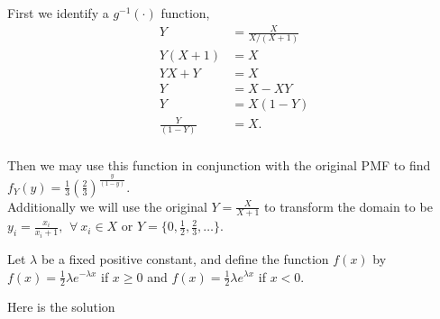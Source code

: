 \documentclass[12pt,letterpaper]{exam}
\begin{document}
\begin{questions}
	\begin{solution}
		First we identify a $g^{-1}(\cdot)$ function,
		\begin{align*}
			Y &= \frac{X}{X/(X+1)} \\
			Y(X+1) &= X \\
			YX+Y &= X \\
			Y &= X- XY \\
			Y &= X(1-Y) \\
			\frac{Y}{(1-Y)} &= X. \\
		\end{align*}
		
		Then we may use this function in conjunction with the original PMF to find
		$f_Y(y) = \frac{1}{3}\left(\frac{2}{3}\right)^\frac{y}{(1-y)}$. \\
		Additionally we will use the original ${Y} = \frac{X}{X+1}$ to transform the domain
		to be ${y_i} = \frac{x_i}{x_i+1}, \,\ \forall\ x_i\in X$ or
		$Y = \{0,\frac{1}{2},\frac{2}{3},\ldots\}$. \\
		
	\end{solution}
	\clearpage
	
	\question Let $\lambda$ be a fixed positive constant, and define the function $f(x)$ by $f(x) = \frac{1}{2} \lambda e^{-\lambda x}$ if $x \ge 0$ and $f(x) = \frac{1}{2} \lambda e^{\lambda x}$ if $x < 0$. 
	
	
	\begin{solution}
		Here is the solution
	\end{solution}
	

\end{questions}
\end{document}
